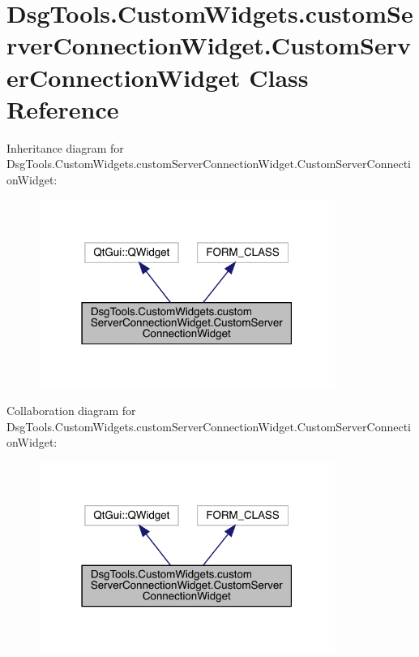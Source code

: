 \hypertarget{class_dsg_tools_1_1_custom_widgets_1_1custom_server_connection_widget_1_1_custom_server_connection_widget}{}\section{Dsg\+Tools.\+Custom\+Widgets.\+custom\+Server\+Connection\+Widget.\+Custom\+Server\+Connection\+Widget Class Reference}
\label{class_dsg_tools_1_1_custom_widgets_1_1custom_server_connection_widget_1_1_custom_server_connection_widget}


Inheritance diagram for Dsg\+Tools.\+Custom\+Widgets.\+custom\+Server\+Connection\+Widget.\+Custom\+Server\+Connection\+Widget\+:
\nopagebreak
\begin{figure}[H]
\begin{center}
\leavevmode
\includegraphics[width=274pt]{class_dsg_tools_1_1_custom_widgets_1_1custom_server_connection_widget_1_1_custom_server_connection_widget__inherit__graph}
\end{center}
\end{figure}


Collaboration diagram for Dsg\+Tools.\+Custom\+Widgets.\+custom\+Server\+Connection\+Widget.\+Custom\+Server\+Connection\+Widget\+:
\nopagebreak
\begin{figure}[H]
\begin{center}
\leavevmode
\includegraphics[width=274pt]{class_dsg_tools_1_1_custom_widgets_1_1custom_server_connection_widget_1_1_custom_server_connection_widget__coll__graph}
\end{center}
\end{figure}
